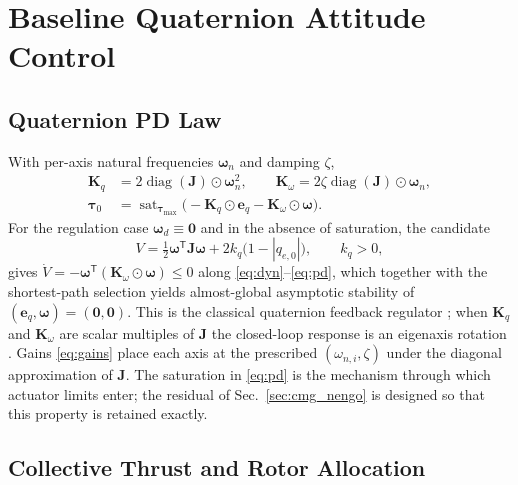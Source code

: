 \documentclass[letterpaper,10pt,conference]{IEEEtran}
\newcommand{\T}{^{\mathsf T}}
\newcommand{\sat}{\operatorname{sat}}
\begin{document}
\section{Baseline Quaternion Attitude Control}
\label{sec:baseline}

\subsection{Quaternion PD Law}

With per-axis natural frequencies $\bm\omega_n$ and damping $\zeta$,
\begin{align}
    \bm K_q &= 2\operatorname{diag}(\bm J)\odot\bm\omega_n^{2},
    \qquad
    \bm K_{\omega} = 2\zeta\operatorname{diag}(\bm J)\odot\bm\omega_n,
    \label{eq:gains}\\
    \bm\tau_0 &= \sat_{\bm\tau_{\max}}\!\big(
        -\bm K_q\odot\bm e_q-\bm K_{\omega}\odot\bm\omega\big).
    \label{eq:pd}
\end{align}
For the regulation case $\bm\omega_d\equiv\bm 0$ and in the absence of
saturation, the candidate
\begin{equation}
    V=\tfrac12\bm\omega\T\bm J\bm\omega
      +2k_q\big(1-|q_{e,0}|\big),\qquad k_q>0,
    \label{eq:lyap}
\end{equation}
gives $\dot V=-\bm\omega\T(\bm K_\omega\odot\bm\omega)\le0$ along
\eqref{eq:dyn}--\eqref{eq:pd}, which together with the shortest-path
selection yields almost-global asymptotic stability of $(\bm e_q,
\bm\omega)=(\bm 0,\bm 0)$. This is the classical quaternion feedback
regulator \cite{wie1985quaternion,hua2009,fresk2013quaternion}; when
$\bm K_q$ and $\bm K_\omega$ are scalar multiples of $\bm J$ the closed-loop
response is an eigenaxis rotation \cite{wie1989eigenaxis}. Gains
\eqref{eq:gains} place each axis at the prescribed $(\omega_{n,i},\zeta)$
under the diagonal approximation of $\bm J$. The saturation in
\eqref{eq:pd} is the mechanism through which actuator limits enter; the
residual of Sec.~\ref{sec:cmg_nengo} is designed so that this property is
retained exactly.

\subsection{Collective Thrust and Rotor Allocation}
\end{document}
